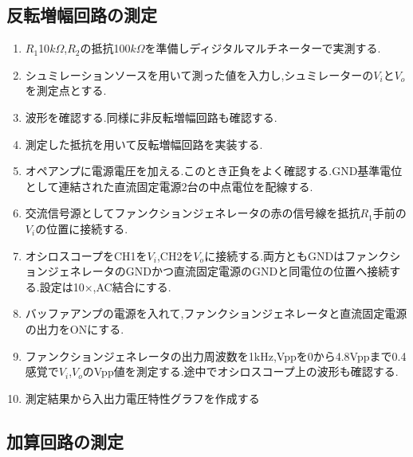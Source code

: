 \documentclass[a4j,10pt,dvipdfmx]{jarticle}
\begin{document}
\subsection{反転増幅回路の測定}
\begin{enumerate}
  \item $R_1$10$k\Omega$,$R_2$の抵抗100$k\Omega$を準備しディジタルマルチネーターで実測する.
  \item シュミレーションソースを用いて測った値を入力し,シュミレーターの$V_i$と$V_o$を測定点とする.
  \item 波形を確認する.同様に非反転増幅回路も確認する.
  \item 測定した抵抗を用いて反転増幅回路を実装する.
  \item オペアンプに電源電圧を加える.このとき正負をよく確認する.GND基準電位として連結された直流固定電源2台の中点電位を配線する.
  \item 交流信号源としてファンクションジェネレータの赤の信号線を抵抗$R_1$手前の$V_i$の位置に接続する.
  \item オシロスコープをCH1を$V_i$,CH2を$V_o$に接続する.両方ともGNDはファンクションジェネレータのGNDかつ直流固定電源のGNDと同電位の位置へ接続する.設定は10×,AC結合にする.
  \item バッファアンプの電源を入れて,ファンクションジェネレータと直流固定電源の出力をONにする.
  \item ファンクションジェネレータの出力周波数を1kHz,Vppを0から4.8Vppまで0.4感覚で$V_i$,$V_o$のVpp値を測定する.途中でオシロスコープ上の波形も確認する.
  \item 測定結果から入出力電圧特性グラフを作成する
\end{enumerate}
\subsection{加算回路の測定}
\end{document}
